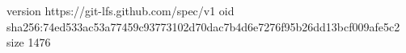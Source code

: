 version https://git-lfs.github.com/spec/v1
oid sha256:74ed533ac53a77459c93773102d70dac7b4d6e7276f95b26dd13bcf009afe5c2
size 1476
